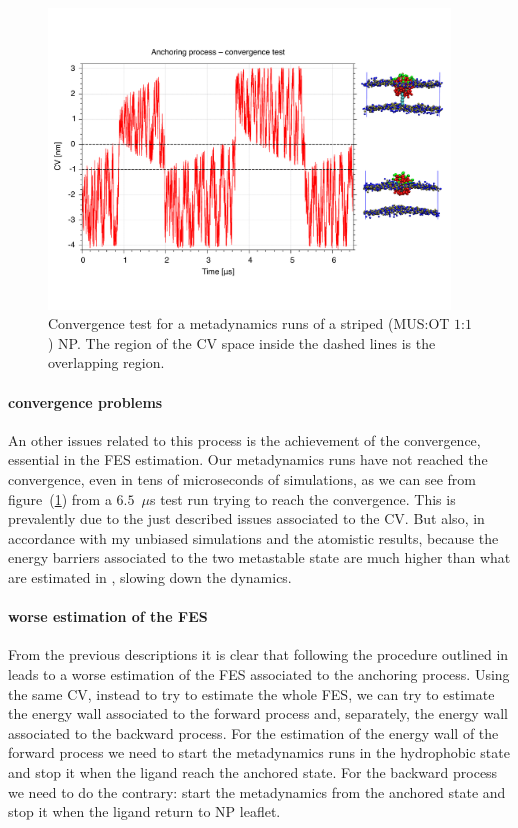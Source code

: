 \begin{figure}[!ht]
	\centering
	\includegraphics[width=0.95\textwidth]{./img/results/convTest}
	\caption{Convergence test for a metadynamics runs of a striped (\acs{MUS}:\acs{OT} $1$:$1$) \acs{NP}. The region of the \acs{CV} space inside the dashed lines is the overlapping region.}
	\label{fig:convTest}
\end{figure}

\paragraph{\textbf{convergence problems}} An other issues related to this process is the achievement of the convergence, essential in the \ac{FES} estimation. Our metadynamics runs have not reached the convergence, even in tens of microseconds of simulations, as we can see from figure~(\ref{fig:convTest}) from a $6.5$~$\mu$s test run trying to reach the convergence. This is prevalently due to the just described issues associated to the \ac{CV}. But also, in accordance with my unbiased simulations and the atomistic results, because the energy barriers associated to the two metastable state are much higher than what are estimated in \cite{ourPaper}, slowing down the dynamics. 

\paragraph{\textbf{worse estimation of the FES}} From the previous descriptions it is clear that following the procedure outlined in \cite{ourPaper} leads to a worse estimation of the \ac{FES} associated to the anchoring process. Using the same \ac{CV}, instead to try to estimate the whole \ac{FES}, we can try to estimate the energy wall associated to the forward process and, separately, the energy wall associated to the backward process. For the estimation of the energy wall of the forward process we need to start the metadynamics runs in the hydrophobic state and stop it when the ligand reach the anchored state. For the backward process we need to do the contrary: start the metadynamics from the anchored state and stop it when the ligand return to \ac{NP} leaflet.


